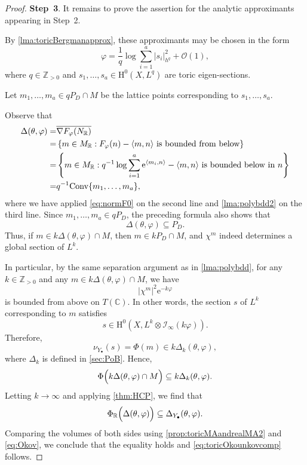 \begin{proof}
    \textbf{Step~3}. It remains to prove the assertion for the analytic approximants appearing in Step~2.

    By \cref{lma:toricBergmanapprox}, these approximants may be chosen in the form
    \[
        \varphi=\frac{1}{q}\log\sum_{i=1}^a |s_i|_{h^q}^2+\mathcal O(1),
    \]
    where $q\in\mathbb Z_{>0}$ and $s_1,\ldots,s_a\in \mathrm{H}^0(X,L^q)$ are toric eigen-sections.

    Let $m_1,\ldots,m_a\in qP_D\cap M$ be the lattice points corresponding to $s_1,\ldots,s_a$.

    Observe that
    \[
    \begin{aligned}
    \Delta(\theta,\varphi)
    =&\overline{\nabla F_{\varphi}(N_{\mathbb{R}})}\\
    =&\left\{ m\in M_{\mathbb{R}} : F_{\varphi}(n)-\langle m,n \rangle \textup{ is bounded from below} \right\}\\
    =& \left\{ m\in M_{\mathbb{R}}:  q^{-1}\log \sum_{i=1}^a \mathrm{e}^{\langle m_i,n\rangle}-\langle m,n\rangle \textup{ is bounded below in } n \right\}\\
    =& q^{-1}\mathrm{Conv} \{m_1,\ldots,m_a\},
    \end{aligned}
    \]
    where we have applied \eqref{eq:normF0} on the second line and \cref{lma:polybdd2} on the third line.
    Since $m_1,\ldots,m_a\in qP_D$, the preceding formula also shows that
    \[
        \Delta(\theta,\varphi)\subseteq P_D.
    \]
    Thus, if $m\in k\Delta(\theta,\varphi)\cap M$, then $m\in kP_D\cap M$, and $\chi^m$ indeed determines a global section of $L^k$.


    In particular, by the same separation argument as in \cref{lma:polybdd}, for any $k\in \mathbb{Z}_{>0}$ and any $m\in k\Delta(\theta,\varphi)\cap M$, we have
    \[
    |\chi^m|^2 \mathrm{e}^{-k\varphi}
    \]
    is bounded from above on $T(\mathbb{C})$. In other words, the section $s$ of $L^k$ corresponding to $m$ satisfies
    \[
    s\in \mathrm{H}^0\left(X,L^k\otimes \mathcal{I}_{\infty}(k\varphi)\right).
    \]
    Therefore,
    \[
    \nu_{Y_{\bullet}}(s)=\Phi(m)\in k\Delta_k(\theta,\varphi),
    \]
    where $\Delta_k$ is defined in \cref{sec:PoB}.
    Hence,
    \[
    \Phi\Bigl(k\Delta(\theta,\varphi)\cap M\Bigr)\subseteq k\Delta_k(\theta,\varphi).
    \]
    Letting $k\to \infty$ and applying \cref{thm:HCP}, we find that
    \[
    \Phi_{\mathbb{R}}\Bigl(\Delta(\theta,\varphi)\Bigr) \subseteq \Delta_{Y_{\bullet}}(\theta,\varphi).
    \]
    Comparing the volumes of both sides using \cref{prop:toricMAandrealMA2} and \eqref{eq:Okov}, we conclude that the equality holds and \eqref{eq:toricOkounkovcomp} follows.
\end{proof}


